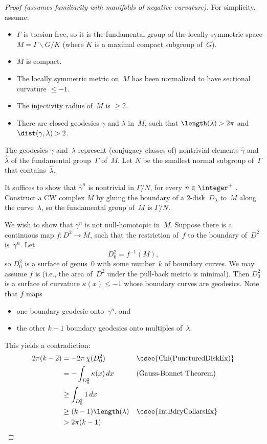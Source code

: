 \begin{proof}[Proof \normalfont (assumes familiarity with manifolds of negative curvature)]
For simplicity, assume:
\noprelistbreak
	\begin{itemize}
	\item $\Gamma$ is torsion free, so it is the fundamental group of the locally symmetric space $M = \Gamma \backslash G / K$ (where $K$ is a maximal compact subgroup of~$G$).
	\item $M$ is compact.
	\item The locally symmetric metric on~$M$ has been normalized to have sectional curvature $\le -1$.
	\item The injectivity radius of~$M$ is $\ge 2$.
	\item There are closed geodesics $\gamma$ and $\lambda$ in~$M$, such that
		 $\length(\lambda) > 2 \pi$
		and
		 $\dist(\gamma,\lambda) > 2$.
	\end{itemize}
The geodesics $\gamma$ and~$\lambda$ represent (conjugacy classes of) nontrivial elements $\widehat\gamma$ and $\widehat\lambda$ of the fundamental group~$\Gamma$ of~$M$. Let $N$ be the smallest normal subgroup of~$\Gamma$ that contains~$\widehat\lambda$.

It suffices to show that $\widehat\gamma^n$ is nontrivial in $\Gamma/N$, for every $n \in \integer^+$ .
Construct a CW complex $\overline{M}$ by gluing the boundary of a $2$-disk~$D_\lambda$ to~$M$ along the curve~$\lambda$, so the fundamental group of~$\overline{M}$ is $\Gamma/N$. 

We wish to show that $\gamma^n$ is not null-homotopic in~$\overline{M}$. 
Suppose there is a continuous map $f \colon D^2 \to \overline{M}$, such that the restriction of~$f$ to the boundary of~$D^2$ is~$\gamma^n$. Let 
	$$D^2_0 = f^{-1}(M) ,$$
so $D^2_0$ is a surface of genus~$0$ with some number~$k$ of boundary curves. 
We may assume $f$ is  (i.e., the area of~$D^2$ under the pull-back metric is minimal). 
Then $D^2_0$ is a surface of curvature $\kappa(x) \le -1$ whose boundary curves are geodesics. 
Note that $f$ maps
	\begin{itemize}
	\item one boundary geodesic onto~$\gamma^n$,
	and
	\item the other $k-1$ boundary geodesics onto multiples of~$\lambda$.
	\end{itemize}
This yields a contradiction:
\begin{align*}
2 \pi (k-2)
&= -2 \pi \, \chi(D^2_0)
&& \text{\csee{Chi(PuncturedDiskEx)}}
\\&= - \int_{D^2_0} \kappa(x) \, dx 
&& \text{(Gauss-Bonnet Theorem)}
\\&\ge  \int_{D^2_0} 1 \, dx 
\\&\ge (k-1) \length(\lambda) 
&& \text{\csee{IntBdryCollarsEx}}
\\&> 2 \pi (k-1)
.  &&\qedhere \end{align*}
\end{proof}


